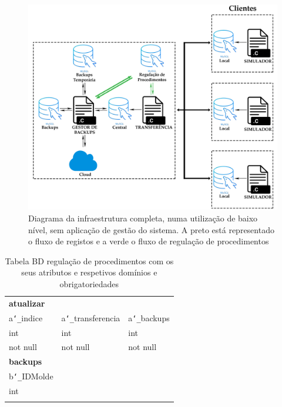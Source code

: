 \documentclass[11pt,twoside,a4paper]{report}
\begin{document}
\begin{figure}
	\begin{center}
		\includegraphics[width=1\textwidth]{Esquema_Projeto_Total01} %
		\caption[Diagrama da infraestrutura completa sem aplicação de gestão do sistema]{Diagrama da infraestrutura completa, numa utilização de baixo nível, sem aplicação de gestão do sistema. A preto está representado o fluxo de registos e a verde o fluxo de regulação de procedimentos}
		\label{fig:infra_total1}
	\end{center}
\end{figure}
\newpage
\begin{table}
	\centering
	\begin{tabular}{|l|l|l|}
		\multicolumn{3}{l}{\textbf{atualizar}}\\ \cline{1-3}
		a\texttt{\char`_}indice & a\texttt{\char`_}transferencia & a\texttt{\char`_}backups\\ \cline{1-3}
		int & int & int\\ \cline{1-3}
		not null & not null & not null\\ \cline{1-3}
		\multicolumn{3}{l}{\textbf{backups}}\\ \cline{1-1}
		b\texttt{\char`_}IDMolde &\multicolumn{2}{l}{}\\ \cline{1-1}
		int &\multicolumn{1}{l}{}\\ \cline{1-1}
		 &\multicolumn{2}{l}{}\\ \cline{1-1}
	\end{tabular}
	\caption[Tabelas da base de dados regulação de procedimentos]{Tabela BD regulação de procedimentos com os seus atributos e respetivos domínios e obrigatoriedades}
	\label{tab:notificacoes}
\end{table}
\end{document}
